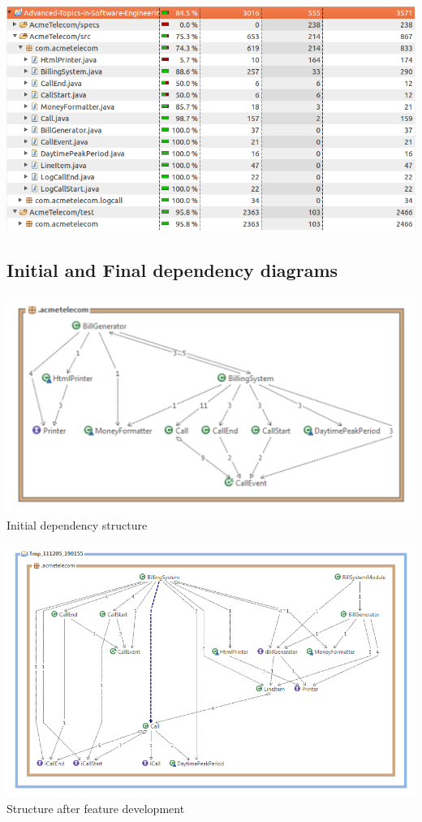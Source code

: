 \documentclass[pdftex,11pt,a4paper]{article}
\begin{document}
\begin{center}
	\includegraphics[scale=0.55]{images/emma_code_coverage_.png}
\end{center}

\subsection{Initial and Final dependency diagrams}

\begin{center}
	\includegraphics[scale=0.7]{images/Acme_Telecom_Structure.pdf}
Initial dependency structure
\end{center}

\begin{center}
	\includegraphics[scale=0.45]{images/AcmeTelecom_Software_Structure_After_Refactoring.png}\\
Structure after feature development
\end{center}
\end{document}
